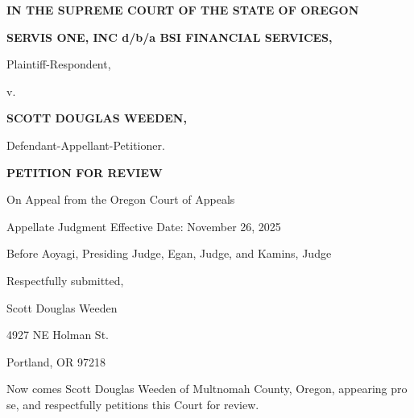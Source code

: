 \documentclass[14pt]{extarticle}
\begin{document}
\thispagestyle{empty}

\begin{center}
{\Large\bfseries IN THE SUPREME COURT OF THE STATE OF OREGON}\par
\vspace{1.25\baselineskip}

{\bfseries SERVIS ONE, INC d/b/a BSI FINANCIAL SERVICES,}\par
Plaintiff-Respondent,\par
v.\par
{\bfseries SCOTT DOUGLAS WEEDEN,}\par
Defendant-Appellant-Petitioner.\par

\vspace{1.25\baselineskip}
{\bfseries PETITION FOR REVIEW}\par
\vspace{0.75\baselineskip}

On Appeal from the Oregon Court of Appeals\par
Appellate Judgment Effective Date: November 26, 2025\par
Before Aoyagi, Presiding Judge, Egan, Judge, and Kamins, Judge\par
\end{center}

\vfill

\begin{flushleft}
Respectfully submitted,\par
\vspace{0.75\baselineskip}
Scott Douglas Weeden\par
4927 NE Holman St.\par
Portland, OR 97218\par
\end{flushleft}

\newpage

\vspace*{0.25\baselineskip}
Now comes Scott Douglas Weeden of Multnomah County, Oregon, appearing pro se, and respectfully petitions this Court for review.
\end{document}
